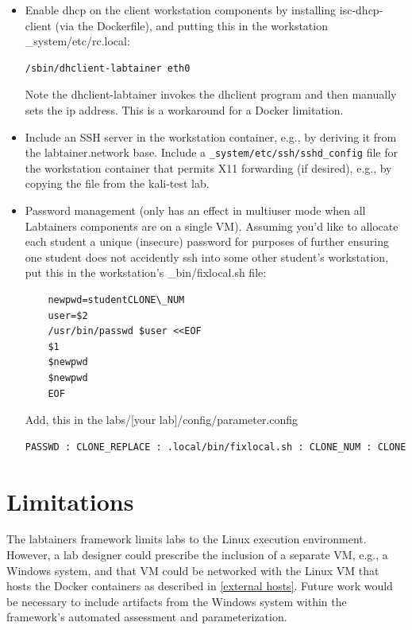 \documentclass[12pt]{article}
\begin{document}
\begin{itemize}
\item Enable dhcp on the client workstation components by installing isc-dhcp-client
(via the Dockerfile), and putting this in the workstation \_system/etc/rc.local:
\begin{verbatim}
/sbin/dhclient-labtainer eth0
\end{verbatim}
\noindent Note the dhclient-labtainer invokes the dhclient program and then
manually sets the ip address.  This is a workaround for a Docker limitation.

\item Include an SSH server in the workstation container, e.g., by deriving it from the labtainer.network base.
Include a {\tt \_system/etc/ssh/sshd\_config} file for the workstation container that permits X11 forwarding (if desired),
e.g., by copying the file from the kali-test lab.

\item Password management (only has an effect in multiuser mode when all Labtainers components are on a single VM). 
Assuming you'd like to allocate each student a unique (insecure) password for purposes of
further ensuring one student does not accidently ssh into some other student's workstation, put
this in the workstation's \_bin/fixlocal.sh file:
\begin{verbatim}
    newpwd=studentCLONE\_NUM
    user=$2
    /usr/bin/passwd $user <<EOF
    $1
    $newpwd
    $newpwd
    EOF
\end{verbatim}

\noindent Add, this in the labs/[your lab]/config/parameter.config
\begin{verbatim}
PASSWD : CLONE_REPLACE : .local/bin/fixlocal.sh : CLONE_NUM : CLONE
\end{verbatim}

\end{itemize}

\section{Limitations}
The labtainers framework limits labs to the Linux execution environment.
However, a lab designer could prescribe the inclusion of a separate
VM, e.g., a Windows system, and that VM could be networked with the Linux
VM that hosts the Docker containers as described in \ref{external hosts}.  
Future work would be necessary to include
artifacts from the Windows system within the framework's automated assessment
and parameterization.
\end{document}
